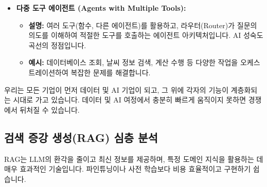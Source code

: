 \documentclass[11pt,a4paper]{article}
\theoremstyle{definition}
\begin{document}
\begin{itemize}
    \item \textbf{다중 도구 에이전트 (Agents with Multiple Tools):}
    \begin{itemize}
        \item \textbf{설명:} 여러 도구(함수, 다른 에이전트)를 활용하고, 라우터(Router)가 질문의 의도를 이해하여 적절한 도구를 호출하는 에이전트 아키텍처입니다. AI 성숙도 곡선의 정점입니다.
        \item \textbf{예시:} 데이터베이스 조회, 날씨 정보 검색, 계산 수행 등 다양한 작업을 오케스트레이션하여 복잡한 문제를 해결합니다.
    \end{itemize}
\end{itemize}

\begin{tcolorbox}[conceptbox={모든 기업은 데이터 및 AI 기업}]
    우리는 모든 기업이 먼저 데이터 및 AI 기업이 되고, 그 위에 각자의 기능이 계층화되는 시대로 가고 있습니다. 데이터 및 AI 여정에서 충분히 빠르게 움직이지 못하면 경쟁에서 뒤처질 수 있습니다.
\end{tcolorbox}

\subsection{검색 증강 생성(RAG) 심층 분석}

RAG는 LLM의 환각을 줄이고 최신 정보를 제공하며, 특정 도메인 지식을 활용하는 데 매우 효과적인 기술입니다. 파인튜닝이나 사전 학습보다 비용 효율적이고 구현하기 쉽습니다.
\end{document}
